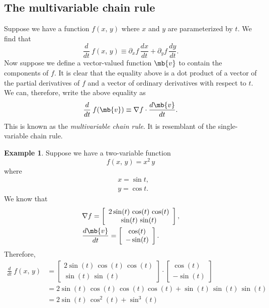 \documentclass[11pt]{article}
\theoremstyle{definition}
\newtheorem{ex}{Example}[section]
\begin{document}
\subsection{The multivariable chain rule}
Suppose we have a function $f(x,\, y)$ where $x$ and $y$ are parameterized by $t$. We find that
$$
\frac{ d }{ d t}\: f(x,\, y) \equiv \partial_x f \,  \frac{ d x}{ d t} +\partial_y f \, \frac{ d y}{ d t}.
$$
Now suppose we define a vector-valued function $\mb{v}$ to contain the components of $f$. It is clear that the equality above is a dot product of a vector of the partial derivatives of $f$ and a vector of ordinary derivatives with respect to $t$. We can, therefore, write the above equality as
$$
\frac{ d }{ d t}\: f(\mb{v}) \equiv \nabla f \cdot \frac{ d \mb{v}}{ d t}.
$$
This is known as the \textit{multivariable chain rule}. It is resemblant of the single-variable chain rule.


\begin{ex} Suppose we have a two-variable function
$$
f(x,\, y) = x^2\, y
$$
where
\begin{align*}
&x = \sin t,\\
&y = \cos t.
\end{align*}
We know that
$$
\begin{aligned}
&\nabla f =  \left[\begin{array}{c}2\sin(t)\, \cos(t) \, \cos(t)  \\\sin(t) \,\sin(t) \end{array}\right],\\
&\frac{ d \mb{v}}{ d t} = \left[\begin{array}{c}\cos(t)  \\-\sin(t) \end{array}\right].
\end{aligned}
$$
Therefore,
$$
\begin{aligned}
\frac{ d }{ d t}\: f(x,\, y)&=\left[\begin{array}{c}2\sin(t)\, \cos(t)\, \cos(t) \\\sin(t)\,\sin(t) \end{array}\right]\cdot\left[\begin{array}{c}\cos(t)  \\-\sin(t) \end{array}\right]\\
&= 2\sin(t)\, \cos(t)\, \cos(t)\cos(t) + \sin(t)\,\sin(t) \,\sin(t)\\
&= \boxed{2\sin(t) \, \cos^2(t)  + \sin^3(t)}
\end{aligned}
$$\end{ex}
\end{document}
